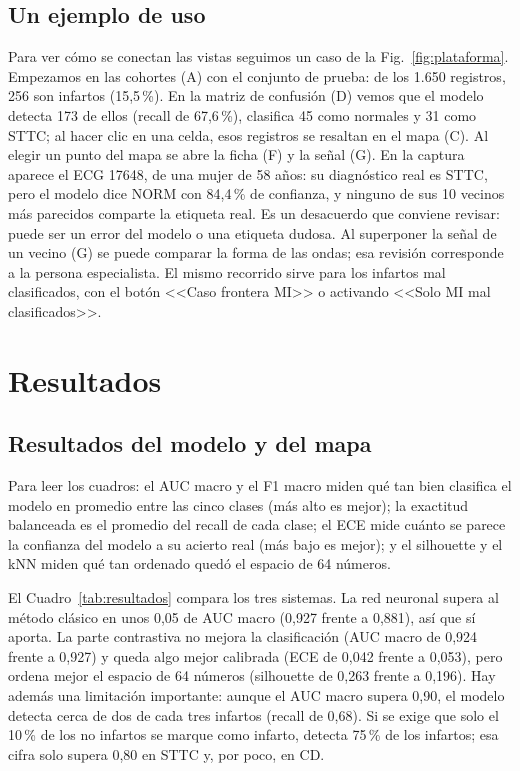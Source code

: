 \documentclass[conference]{IEEEtran}
\begin{document}
\subsection{Un ejemplo de uso}
Para ver cómo se conectan las vistas seguimos un caso de la Fig.~\ref{fig:plataforma}. Empezamos en las cohortes (A) con el conjunto de prueba: de los 1.650 registros, 256 son infartos (15,5\,\%). En la matriz de confusión (D) vemos que el modelo detecta 173 de ellos (recall de 67,6\,\%), clasifica 45 como normales y 31 como STTC; al hacer clic en una celda, esos registros se resaltan en el mapa (C). Al elegir un punto del mapa se abre la ficha (F) y la señal (G). En la captura aparece el ECG 17648, de una mujer de 58 años: su diagnóstico real es STTC, pero el modelo dice NORM con 84,4\,\% de confianza, y ninguno de sus 10 vecinos más parecidos comparte la etiqueta real. Es un desacuerdo que conviene revisar: puede ser un error del modelo o una etiqueta dudosa. Al superponer la señal de un vecino (G) se puede comparar la forma de las ondas; esa revisión corresponde a la persona especialista. El mismo recorrido sirve para los infartos mal clasificados, con el botón <<Caso frontera MI>> o activando <<Solo MI mal clasificados>>.

\section{Resultados}
\subsection{Resultados del modelo y del mapa}
Para leer los cuadros: el AUC macro y el F1 macro miden qué tan bien clasifica el modelo en promedio entre las cinco clases (más alto es mejor); la exactitud balanceada es el promedio del recall de cada clase; el ECE mide cuánto se parece la confianza del modelo a su acierto real (más bajo es mejor); y el silhouette y el kNN miden qué tan ordenado quedó el espacio de 64 números.

El Cuadro~\ref{tab:resultados} compara los tres sistemas. La red neuronal supera al método clásico en unos 0,05 de AUC macro (0,927 frente a 0,881), así que sí aporta. La parte contrastiva no mejora la clasificación (AUC macro de 0,924 frente a 0,927) y queda algo mejor calibrada (ECE de 0,042 frente a 0,053), pero ordena mejor el espacio de 64 números (silhouette de 0,263 frente a 0,196). Hay además una limitación importante: aunque el AUC macro supera 0,90, el modelo detecta cerca de dos de cada tres infartos (recall de 0,68). Si se exige que solo el 10\,\% de los no infartos se marque como infarto, detecta 75\,\% de los infartos; esa cifra solo supera 0,80 en STTC y, por poco, en CD.
\end{document}

